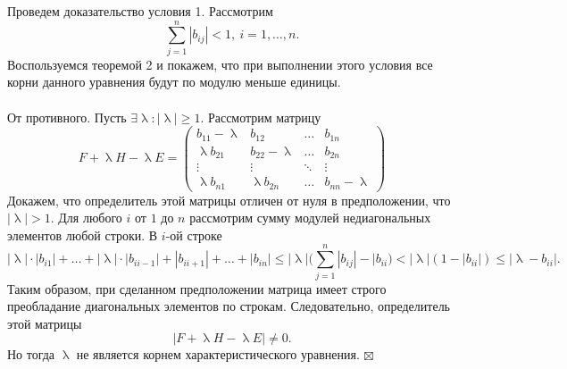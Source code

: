 \documentclass[a4paper, 12pt]{report}
\newenvironment{Proof} %
{\par\noindent{$\blacklozenge$}} %
{\hfill$\scriptstyle\boxtimes$}
\renewcommand{\leq}{\leqslant}
\renewcommand{\geq}{\geqslant}
\renewcommand{\lambda}{\uplambda}
\begin{document}
	\begin{Proof}
		Проведем доказательство условия 1. Рассмотрим $$\sum_{j=1}^{n}|b_{ij}| < 1,\ i = 1,\ldots, n.$$ Воспользуемся теоремой 2 и покажем, что при выполнении этого условия все корни данного уравнения будут по модулю меньше единицы.\\\\ От противного. Пусть $\exists \lambda: |\lambda| \geq 1$. Рассмотрим матрицу $$F + \lambda H - \lambda E = \begin{pmatrix}
		b_{11} - \lambda & b_{12} & \ldots & b_{1n}\\
		\lambda b_{21} & b_{22} - \lambda & \ldots & b_{2n}\\
		\vdots & \vdots & \ddots & \vdots\\
		\lambda b_{n1} & \lambda b_{2n} & \ldots & b_{nn} - \lambda
		\end{pmatrix}$$ 
		Докажем, что определитель этой матрицы отличен от нуля в предположении, что $|\lambda| > 1$. Для любого $i$ от $1$ до $n$ рассмотрим сумму модулей недиагональных элементов любой строки. 
		В $i$-ой строке $$|\lambda| \cdot|b_{i1}| + \ldots + |\lambda| \cdot |b_{ii-1}| + |b_{ii+1}| + \ldots + |b_{in}| \leq |\lambda|\Big(\sum_{j=1}^{n}|b_{ij}| - |b_{ii}\Big)< |\lambda| (1-|b_{ii}|)\leq |\lambda - b_{ii}|.$$
		Таким образом, при сделанном предположении матрица имеет строго преобладание диагональных элементов по строкам. Следовательно, определитель этой матрицы $$|F + \lambda H - \lambda E|\ne 0.$$ Но тогда $\lambda$ не является корнем характеристического уравнения.
	\end{Proof}
\end{document}
